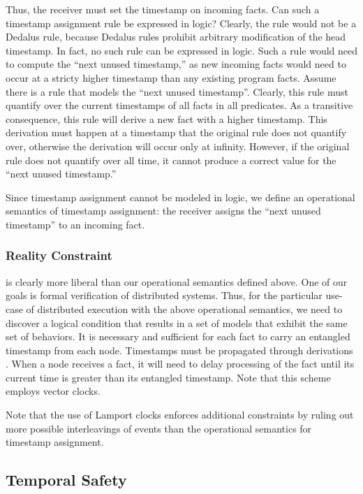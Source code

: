 Thus, the receiver must set the timestamp on incoming  facts.  Can such a timestamp assignment rule be expressed in logic?  Clearly, the rule would not be a Dedalus rule, because Dedalus rules prohibit arbitrary modification of the head timestamp.  In fact, no such rule can be expressed in logic.  Such a rule would need to compute the ``next unused timestamp,''  as new incoming facts would need to occur at a stricty higher timestamp than any existing program facts.  Assume there is a rule that models the ``next unused timestamp''.  Clearly, this rule must quantify over the current timestamps of all facts in all predicates.  As a transitive consequence, this rule will derive a new fact with a higher timestamp.  This derivation must happen at a timestamp that the original rule does not quantify over, otherwise the derivation will occur only at infinity.  However, if the original rule does not quantify over all time, it cannot produce a correct value for the ``next unused timestamp.''

Since timestamp assignment cannot be modeled in logic, we define an operational semantics of timestamp assignment:   the receiver assigns the ``next unused timestamp'' to an incoming fact.

\subsubsection{Reality Constraint}

 is clearly more liberal than our operational semantics defined above.  One of our goals is formal verification of distributed systems.  Thus, for the particular use-case of distributed execution with the above operational semantics, we need to discover a logical condition that results in a set of models that exhibit the same set of behaviors.  It is  necessary and sufficient for each fact to carry an entangled timestamp from each node.  Timestamps must be propagated through derivations .  When a node receives a fact, it will need to delay processing of the fact until its current time is greater than its entangled timestamp.  Note that this scheme employs vector clocks.

Note that the use of Lamport clocks enforces additional constraints by ruling out more possible interleavings of events than the operational semantics for timestamp assignment. 

\subsection{Temporal Safety}

